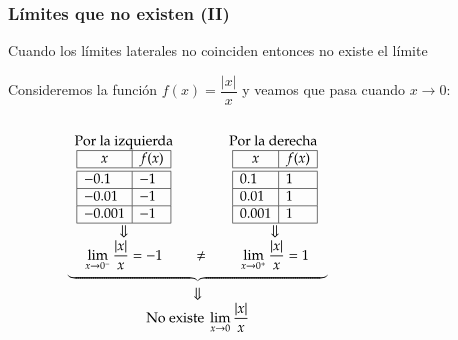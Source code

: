 \begin{frame}
	\frametitle{Límites que no existen (II)}
	Cuando los límites laterales no coinciden entonces no existe el límite
	
	 Consideremos la función $f(x)=\dfrac{|x|}{x}$ y veamos que pasa cuando $x\rightarrow 0$:
	\begin{columns}
		\begin{column}{0.6\textwidth}
			\[
				\begin{array}{c}
					\underbrace{\begin{array}{ccc}
					\textrm{Por la izquierda} & \qquad & \textrm{Por la derecha } \\
					\begin{array}{|l|l|}
					\hline
					\multicolumn{1}{|c|}{x}      & \multicolumn{1}{c|}{f(x)}   \\
					\hline\hline
					-0.1   & -1       \\
					\hline
					-0.01   & -1     \\
					\hline
					-0.001  & -1   \\
					\hline
				\end{array}
				& &
				\begin{array}{|l|l|}
					\hline
					\multicolumn{1}{|c|}{x} & \multicolumn{1}{c|}{f(x)} \\
					\hline\hline
					0.1                     & 1                         \\
					\hline
					0.01                    & 1                         \\
					\hline
					0.001                   & 1                         \\
					\hline
				\end{array}\\
				\Downarrow & & \Downarrow\\
				\displaystyle \lim_{x\rightarrow 0^-}\frac{|x|}{x}=-1
				&\neq &
				\displaystyle \lim_{x\rightarrow 0^+}\frac{|x|}{x}=1
				\end{array}}\\
				\Downarrow\\
				\displaystyle \textrm{No existe }\lim_{x\rightarrow 0}\frac{|x|}{x}
				\end{array}
			\]
		\end{column}
		\begin{column}{0.4\textwidth}
			\begin{center}
				\scalebox{1}{}
			\end{center}
		\end{column}
	\end{columns}
\end{frame}

